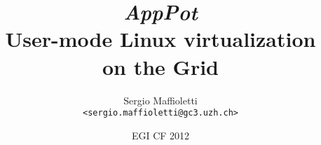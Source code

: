 \documentclass{beamer}
\title[AppPot]{%
  \emph{AppPot} 
  \\
  User-mode Linux virtualization \\ on the Grid
}
\author[S.\ Maffioletti]{Sergio Maffioletti
  \\ \texttt{<sergio.maffioletti@gc3.uzh.ch>}}%
\institute[GC3, University of Zurich]%
{\href{http://www.gc3.uzh.ch/}{Grid Computing Competence Centre}, 
  \\ \href{http://www.uzh.ch/}{University of Zurich}
  \\ \url{http://www.gc3.uzh.ch/}}%
\date{EGI CF 2012}%
\begin{document}
\newcommand{\+}{\vspace{1em}}


\begin{frame}
\maketitle
\end{frame}

%
%
%
%

%
%
\end{document}
